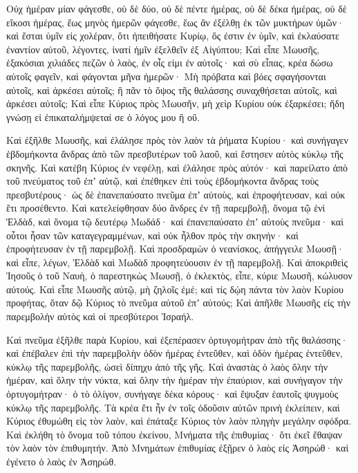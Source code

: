 {Οὐχ ἡμέραν μίαν φάγεσθε, οὐ δὲ δύο, οὐ δὲ πέντε ἡμέρας, οὐ δὲ δέκα ἡμέρας, οὐ δὲ εἴκοσι ἡμέρας,
ἕως μηνὸς ἡμερῶν φάγεσθε, ἕως ἂν ἐξέλθῃ ἐκ τῶν μυκτήρων ὑμῶν· καὶ ἔσται ὑμῖν εἰς χολέραν, ὅτι ἠπειθήσατε Κυρίῳ, ὅς ἐστιν ἐν ὑμῖν, καὶ ἐκλαύσατε ἐναντίον αὐτοῦ, λέγοντες, ἱνατί ἡμῖν ἐξελθεῖν ἐξ Αἰγύπτου;
Καὶ εἶπε Μωυσῆς, ἑξακόσιαι χιλιάδες πεζῶν ὁ λαὸς, ἐν οἷς εἰμι ἐν αὐτοῖς· καὶ σὺ εἶπας, κρέα δώσω αὐτοῖς φαγεῖν, καὶ φάγονται μῆνα ἡμερῶν·
Μὴ πρόβατα καὶ βόες σφαγήσονται αὐτοῖς, καὶ ἀρκέσει αὐτοῖς; ἢ πᾶν τὸ ὄψος τῆς θαλάσσης συναχθήσεται αὐτοῖς, καὶ ἀρκέσει αὐτοῖς;
Καὶ εἶπε Κύριος πρὸς Μωυσῆν, μὴ χεὶρ Κυρίου οὐκ ἐξαρκέσει; ἤδη γνώσῃ εἰ ἐπικαταλήμψεταί σε ὁ λόγος μου ἢ οὔ.
\par }{\PP {}Καὶ ἐξῆλθε Μωυσῆς, καὶ ἐλάλησε πρὸς τὸν λαὸν τὰ ῥήματα Κυρίου· καὶ συνήγαγεν ἑβδομήκοντα ἄνδρας ἀπὸ τῶν πρεσβυτέρων τοῦ λαοῦ, καὶ ἔστησεν αὐτὸς κύκλῳ τῆς σκηνῆς.
Καὶ κατέβη Κύριος ἐν νεφέλῃ, καὶ ἐλάλησε πρὸς αὐτόν· καὶ παρείλατο ἀπὸ τοῦ πνεύματος τοῦ ἐπʼ αὐτῷ, καὶ ἐπέθηκεν ἐπὶ τοὺς ἑβδομήκοντα ἄνδρας τοὺς πρεσβυτέρους· ὡς δὲ ἐπανεπαύσατο πνεῦμα ἐπʼ αὐτοὺς, καὶ ἐπροφήτευσαν, καὶ οὐκ ἔτι προσέθεντο.
Καὶ κατελείφθησαν δύο ἄνδρες ἐν τῇ παρεμβολῇ, ὄνομα τῷ ἑνὶ Ἑλδὰδ, καὶ ὄνομα τῷ δευτέρῳ Μωδάδ· καὶ ἐπανεπαύσατο ἐπʼ αὐτοὺς πνεῦμα· καὶ οὗτοι ἦσαν τῶν καταγεγραμμένων, καὶ οὐκ ἦλθον πρὸς τὴν σκηνήν· καὶ ἐπροφήτευσαν ἐν τῇ παρεμβολῇ.
Καὶ προσδραμὼν ὁ νεανίσκος, ἀπήγγειλε Μωυσῇ· καὶ εἶπε, λέγων, Ἑλδὰδ καὶ Μωδὰδ προφητεύουσιν ἐν τῇ παρεμβολῇ.
Καὶ ἀποκριθεὶς Ἰησοῦς ὁ τοῦ Ναυὴ, ὁ παρεστηκὼς Μωυσῇ, ὁ ἐκλεκτὸς, εἶπε, κύριε Μωυσῆ, κώλυσον αὐτούς.
Καὶ εἶπε Μωυσῆς αὐτῷ, μὴ ζηλοῖς ἐμέ; καὶ τίς δῴη πάντα τὸν λαὸν Κυρίου προφήτας, ὅταν δῷ Κύριος τὸ πνεῦμα αὐτοῦ ἐπʼ αὐτούς;
Καὶ ἀπῆλθε Μωυσῆς εἰς τὴν παρεμβολὴν αὐτὸς καὶ οἱ πρεσβύτεροι Ἰσραήλ.
\par }{\PP {}Καὶ πνεῦμα ἐξῆλθε παρὰ Κυρίου, καὶ ἐξεπέρασεν ὀρτυγομήτραν ἀπὸ τῆς θαλάσσης· καὶ ἐπέβαλεν ἐπὶ τὴν παρεμβολὴν ὁδὸν ἡμέρας ἐντεῦθεν, καὶ ὁδὸν ἡμέρας ἐντεῦθεν, κύκλῳ τῆς παρεμβολῆς, ὡσεὶ δίπηχυ ἀπὸ τῆς γῆς.
Καὶ ἀναστὰς ὁ λαὸς ὅλην τὴν ἡμέραν, καὶ ὅλην τὴν νύκτα, καὶ ὅλην τὴν ἡμέραν τὴν ἐπαύριον, καὶ συνήγαγον τὴν ὀρτυγομήτραν· ὁ τὸ ὀλίγον, συνήγαγε δέκα κόρους· καὶ ἔψυξαν ἑαυτοῖς ψυγμοὺς κύκλῳ τῆς παρεμβολῆς.
Τὰ κρέα ἔτι ἦν ἐν τοῖς ὀδοῦσιν αὐτῶν πρινὴ ἐκλείπειν, καὶ Κύριος ἐθυμώθη εἰς τὸν λαὸν, καὶ ἐπάταξε Κύριος τὸν λαὸν πληγὴν μεγάλην σφόδρα.
Καὶ ἐκλήθη τὸ ὄνομα τοῦ τόπου ἐκείνου, Μνήματα τῆς ἐπιθυμίας· ὅτι ἐκεῖ ἔθαψαν τὸν λαὸν τὸν ἐπιθυμητήν.
Ἀπὸ Μνημάτων ἐπιθυμίας ἐξῇρεν ὁ λαὸς εἰς Ἀσηρώθ· καὶ ἐγένετο ὁ λαὸς ἐν Ἀσηρώθ.

}
